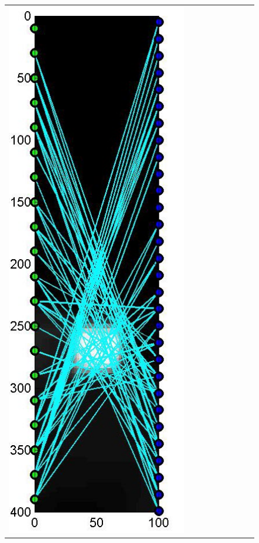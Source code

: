 \documentclass[11pt]{article}
\begin{document}
{\begin{figure}[!h]
\begin{center}
\begin{tabular}{|c|c|c|c|c|c|c|c|c|}
			\includegraphics[width=.9\iwidth]{figures/newFigs/noisy/resultsExp-6-designs}
			&

\end{tabular}
\end{center}
\end{figure}}
\end{document}
